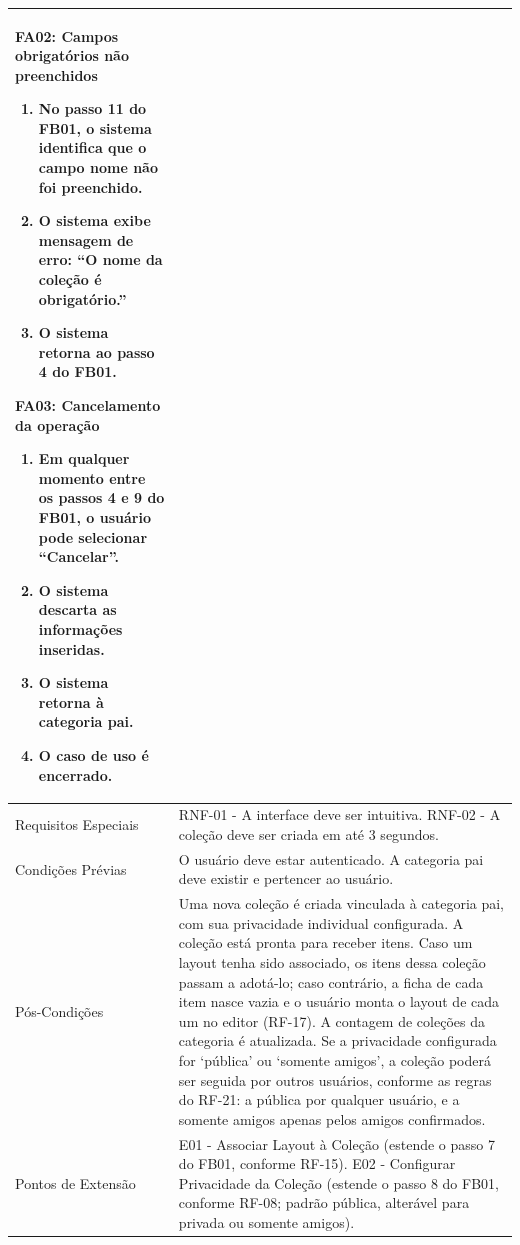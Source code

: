 \begin{longtable}{ >{\raggedright}p{2.8cm} | >{\raggedright\arraybackslash}p{10.7cm} }
\textbf{FA02:} Campos obrigatórios não preenchidos
\vspace{2pt}
\begin{enumerate}[nosep,leftmargin=1.2em,topsep=0pt,partopsep=0pt,parsep=0pt,itemsep=0pt,after=\vspace{2pt}]
	\item No passo 11 do FB01, o sistema identifica que o campo nome não foi preenchido.
	\item O sistema exibe mensagem de erro: ``O nome da coleção é obrigatório.''
	\item O sistema retorna ao passo 4 do FB01.
\end{enumerate}

\textbf{FA03:} Cancelamento da operação
\vspace{2pt}
\begin{enumerate}[nosep,leftmargin=1.2em,topsep=0pt,partopsep=0pt,parsep=0pt,itemsep=0pt,after=\vspace{2pt}]
	\item Em qualquer momento entre os passos 4 e 9 do FB01, o usuário pode selecionar ``Cancelar''.
	\item O sistema descarta as informações inseridas.
	\item O sistema retorna à categoria pai.
	\item O caso de uso é encerrado.
\end{enumerate}
\mbox{} \\ \hline

Requisitos Especiais & RNF-01 - A interface deve ser intuitiva. RNF-02 - A coleção deve ser criada em até 3 segundos. \\ \hline

Condições Prévias & O usuário deve estar autenticado. A categoria pai deve existir e pertencer ao usuário. \\ \hline

Pós-Condições & Uma nova coleção é criada vinculada à categoria pai, com sua privacidade individual configurada. A coleção está pronta para receber itens. Caso um layout tenha sido associado, os itens dessa coleção passam a adotá-lo; caso contrário, a ficha de cada item nasce vazia e o usuário monta o layout de cada um no editor (RF-17). A contagem de coleções da categoria é atualizada. Se a privacidade configurada for `pública' ou `somente amigos', a coleção poderá ser seguida por outros usuários, conforme as regras do RF-21: a pública por qualquer usuário, e a somente amigos apenas pelos amigos confirmados. \\ \hline

Pontos de Extensão & E01 - Associar Layout à Coleção (estende o passo 7 do FB01, conforme RF-15). E02 - Configurar Privacidade da Coleção (estende o passo 8 do FB01, conforme RF-08; padrão pública, alterável para privada ou somente amigos). \\
\end{longtable}
\renewcommand{\arraystretch}{1}
\FloatBarrier


